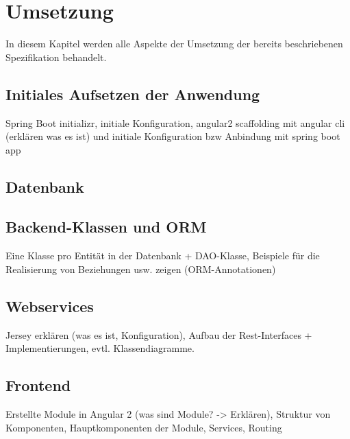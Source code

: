 \section{Umsetzung}
In diesem Kapitel werden alle Aspekte der Umsetzung der bereits beschriebenen Spezifikation behandelt. 
\subsection{Initiales Aufsetzen der Anwendung}
Spring Boot initializr, initiale Konfiguration, angular2 scaffolding mit angular cli (erklären was es ist) und initiale Konfiguration bzw Anbindung mit spring boot app

\subsection{Datenbank}


\subsection{Backend-Klassen und ORM}
Eine Klasse pro Entität in der Datenbank + DAO-Klasse, Beispiele für die Realisierung von Beziehungen usw. zeigen (ORM-Annotationen)

\subsection{Webservices}
Jersey erklären (was es ist, Konfiguration), Aufbau der Rest-Interfaces + Implementierungen, evtl. Klassendiagramme. 

\subsection{Frontend}
Erstellte Module in Angular 2 (was sind Module? -> Erklären), Struktur von Komponenten, Hauptkomponenten der Module, Services, Routing